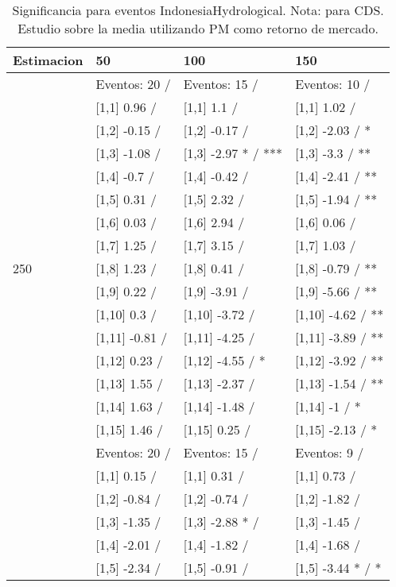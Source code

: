 \begin{table}

\caption{Significancia para eventos IndonesiaHydrological. Nota: para CDS. Estudio sobre la media utilizando PM como retorno de mercado.}
\centering
\begin{tabular}[t]{llll}
\toprule
Estimacion & 50 & 100 & 150\\
\midrule
 & Eventos:  20 / & Eventos:  15 / & Eventos:  10 /\\
 & {}[1,1] 0.96  / & {}[1,1] 1.1  / & {}[1,1] 1.02  /\\
 & {}[1,2] -0.15  / & {}[1,2] -0.17  / & {}[1,2] -2.03  / *\\
 & {}[1,3] -1.08  / & {}[1,3] -2.97 * / *** & {}[1,3] -3.3  / **\\
 & {}[1,4] -0.7  / & {}[1,4] -0.42  / & {}[1,4] -2.41  / **\\
\addlinespace
 & {}[1,5] 0.31  / & {}[1,5] 2.32  / & {}[1,5] -1.94  / **\\
 & {}[1,6] 0.03  / & {}[1,6] 2.94  / & {}[1,6] 0.06  /\\
 & {}[1,7] 1.25  / & {}[1,7] 3.15  / & {}[1,7] 1.03  /\\
250 & {}[1,8] 1.23  / & {}[1,8] 0.41  / & {}[1,8] -0.79  / **\\
 & {}[1,9] 0.22  / & {}[1,9] -3.91  / & {}[1,9] -5.66  / **\\
\addlinespace
 & {}[1,10] 0.3  / & {}[1,10] -3.72  / & {}[1,10] -4.62  / **\\
 & {}[1,11] -0.81  / & {}[1,11] -4.25  / & {}[1,11] -3.89  / **\\
 & {}[1,12] 0.23  / & {}[1,12] -4.55  / * & {}[1,12] -3.92  / **\\
 & {}[1,13] 1.55  / & {}[1,13] -2.37  / & {}[1,13] -1.54  / **\\
 & {}[1,14] 1.63  / & {}[1,14] -1.48  / & {}[1,14] -1  / *\\
\addlinespace
 & {}[1,15] 1.46  / & {}[1,15] 0.25  / & {}[1,15] -2.13  / *\\
 & Eventos:  20 / & Eventos:  15 / & Eventos:  9 /\\
 & {}[1,1] 0.15  / & {}[1,1] 0.31  / & {}[1,1] 0.73  /\\
 & {}[1,2] -0.84  / & {}[1,2] -0.74  / & {}[1,2] -1.82  /\\
 & {}[1,3] -1.35  / & {}[1,3] -2.88 * / & {}[1,3] -1.45  /\\
\addlinespace
 & {}[1,4] -2.01  / & {}[1,4] -1.82  / & {}[1,4] -1.68  /\\
 & {}[1,5] -2.34  / & {}[1,5] -0.91  / & {}[1,5] -3.44 * / *\\

\end{tabular}
\end{table}
